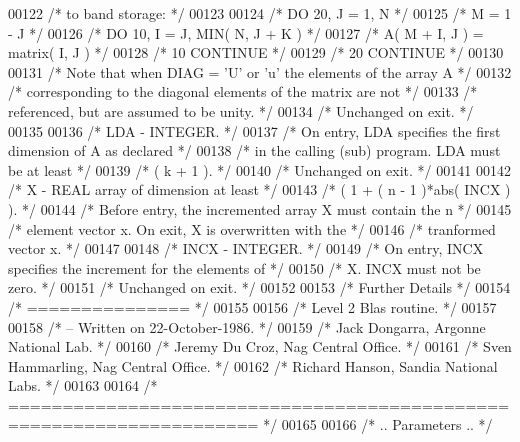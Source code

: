 \begin{DoxyCode}
00122 \textcolor{comment}{/*           to band storage: */}
00123 
00124 \textcolor{comment}{/*                 DO 20, J = 1, N */}
00125 \textcolor{comment}{/*                    M = 1 - J */}
00126 \textcolor{comment}{/*                    DO 10, I = J, MIN( N, J + K ) */}
00127 \textcolor{comment}{/*                       A( M + I, J ) = matrix( I, J ) */}
00128 \textcolor{comment}{/*              10    CONTINUE */}
00129 \textcolor{comment}{/*              20 CONTINUE */}
00130 
00131 \textcolor{comment}{/*           Note that when DIAG = 'U' or 'u' the elements of the array A */}
00132 \textcolor{comment}{/*           corresponding to the diagonal elements of the matrix are not */}
00133 \textcolor{comment}{/*           referenced, but are assumed to be unity. */}
00134 \textcolor{comment}{/*           Unchanged on exit. */}
00135 
00136 \textcolor{comment}{/*  LDA    - INTEGER. */}
00137 \textcolor{comment}{/*           On entry, LDA specifies the first dimension of A as declared */}
00138 \textcolor{comment}{/*           in the calling (sub) program. LDA must be at least */}
00139 \textcolor{comment}{/*           ( k + 1 ). */}
00140 \textcolor{comment}{/*           Unchanged on exit. */}
00141 
00142 \textcolor{comment}{/*  X      - REAL             array of dimension at least */}
00143 \textcolor{comment}{/*           ( 1 + ( n - 1 )*abs( INCX ) ). */}
00144 \textcolor{comment}{/*           Before entry, the incremented array X must contain the n */}
00145 \textcolor{comment}{/*           element vector x. On exit, X is overwritten with the */}
00146 \textcolor{comment}{/*           tranformed vector x. */}
00147 
00148 \textcolor{comment}{/*  INCX   - INTEGER. */}
00149 \textcolor{comment}{/*           On entry, INCX specifies the increment for the elements of */}
00150 \textcolor{comment}{/*           X. INCX must not be zero. */}
00151 \textcolor{comment}{/*           Unchanged on exit. */}
00152 
00153 \textcolor{comment}{/*  Further Details */}
00154 \textcolor{comment}{/*  =============== */}
00155 
00156 \textcolor{comment}{/*  Level 2 Blas routine. */}
00157 
00158 \textcolor{comment}{/*  -- Written on 22-October-1986. */}
00159 \textcolor{comment}{/*     Jack Dongarra, Argonne National Lab. */}
00160 \textcolor{comment}{/*     Jeremy Du Croz, Nag Central Office. */}
00161 \textcolor{comment}{/*     Sven Hammarling, Nag Central Office. */}
00162 \textcolor{comment}{/*     Richard Hanson, Sandia National Labs. */}
00163 
00164 \textcolor{comment}{/*  ===================================================================== */}
00165 
00166 \textcolor{comment}{/*     .. Parameters .. */}

\end{DoxyCode}
